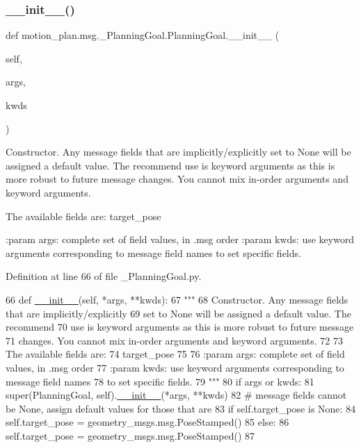 \subsubsection{\texorpdfstring{\+\_\+\+\_\+init\+\_\+\+\_\+()}{\_\_init\_\_()}}
{\footnotesize\ttfamily def motion\+\_\+plan.\+msg.\+\_\+\+Planning\+Goal.\+Planning\+Goal.\+\_\+\+\_\+init\+\_\+\+\_\+ (\begin{DoxyParamCaption}\item[{}]{self,  }\item[{}]{args,  }\item[{}]{kwds }\end{DoxyParamCaption})}

\begin{DoxyVerb}Constructor. Any message fields that are implicitly/explicitly
set to None will be assigned a default value. The recommend
use is keyword arguments as this is more robust to future message
changes.  You cannot mix in-order arguments and keyword arguments.

The available fields are:
   target_pose

:param args: complete set of field values, in .msg order
:param kwds: use keyword arguments corresponding to message field names
to set specific fields.
\end{DoxyVerb}
 

Definition at line 66 of file \+\_\+\+Planning\+Goal.\+py.


\begin{DoxyCode}
66   \textcolor{keyword}{def }\hyperlink{classstate__machine_1_1Play_a5993a23d8be7f7b2647f71ede0334957}{\_\_init\_\_}(self, *args, **kwds):
67     \textcolor{stringliteral}{"""}
68 \textcolor{stringliteral}{    Constructor. Any message fields that are implicitly/explicitly}
69 \textcolor{stringliteral}{    set to None will be assigned a default value. The recommend}
70 \textcolor{stringliteral}{    use is keyword arguments as this is more robust to future message}
71 \textcolor{stringliteral}{    changes.  You cannot mix in-order arguments and keyword arguments.}
72 \textcolor{stringliteral}{}
73 \textcolor{stringliteral}{    The available fields are:}
74 \textcolor{stringliteral}{       target\_pose}
75 \textcolor{stringliteral}{}
76 \textcolor{stringliteral}{    :param args: complete set of field values, in .msg order}
77 \textcolor{stringliteral}{    :param kwds: use keyword arguments corresponding to message field names}
78 \textcolor{stringliteral}{    to set specific fields.}
79 \textcolor{stringliteral}{    """}
80     \textcolor{keywordflow}{if} args \textcolor{keywordflow}{or} kwds:
81       super(PlanningGoal, self).\hyperlink{classstate__machine_1_1Play_a5993a23d8be7f7b2647f71ede0334957}{\_\_init\_\_}(*args, **kwds)
82       \textcolor{comment}{# message fields cannot be None, assign default values for those that are}
83       \textcolor{keywordflow}{if} self.target\_pose \textcolor{keywordflow}{is} \textcolor{keywordtype}{None}:
84         self.target\_pose = geometry\_msgs.msg.PoseStamped()
85     \textcolor{keywordflow}{else}:
86       self.target\_pose = geometry\_msgs.msg.PoseStamped()
87 
\end{DoxyCode}


